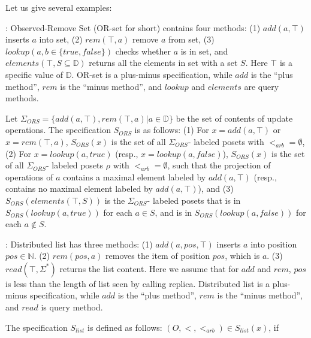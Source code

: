 Let us give several examples:

: Observed-Remove Set (OR-set for short) \cite{Shapiro:2011,Bieniusa:2012} contains four methods: (1) $add(a,\top)$ inserts $a$ into set, (2) $rem(\top,a)$ remove $a$ from set, (3) $lookup(a, b \in \{ \textit{true}, \textit{false} \})$ checks whether $a$ is in set, and $elements(\top, S \subseteq \mathbb{D})$ returns all the elements in set with a set $S$. Here $\top$ is a specific value of $\mathbb{D}$. OR-set is a plus-minus specification, while $add$ is the ``plus method'', $rem$ is the ``minus method'', and $lookup$ and $elements$ are query methods.


Let $\Sigma_{\textit{ORS}} = \{ add(a,\top),rem(\top,a) \vert a \in \mathbb{D} \}$ be the set of contents of update operations. The specification $S_{\textit{ORS}}$ is as follows: (1) For $x=add(a,\top)$ or $x = rem(\top,a)$, $S_{\textit{ORS}}(x)$ is the set of all $\Sigma_{\textit{ORS}}$- labeled posets with $<_{\textit{arb}} = \emptyset$, (2) For $x=lookup(a,\textit{true})$ (resp., $x=lookup(a,\textit{false})$), $S_{\textit{ORS}}(x)$ is the set of all $\Sigma_{\textit{ORS}}$- labeled posets $\rho$ with $<_{\textit{arb}} = \emptyset$, such that the projection of operations of $a$ contains a maximal element labeled by $add(a,\top)$ (resp., contains no maximal element labeled by $add(a,\top)$), and (3) $S_{\textit{ORS}}(elements(\top,S))$ is the $\Sigma_{\textit{ORS}}$- labeled posets that is in $S_{\textit{ORS}}(lookup(a,\textit{true}))$ for each $a \in S$, and is in $S_{\textit{ORS}}(lookup(a,\textit{false}))$ for each $a \notin S$.

: Distributed list has three methods: (1) $add(a,pos,\top)$ inserts $a$ into position $pos \in \mathbb{N}$. (2) $rem(pos,a)$ removes the item of position $pos$, which is $a$. (3) $read(\top,\Sigma^*)$ returns the list content. Here we assume that for $add$ and $rem$, $pos$ is less than the length of list seen by calling replica. Distributed list is a plus-minus specification, while $add$ is the ``plus method'', $rem$ is the ``minus method'', and $read$ is query method.

The specification $S_{\textit{list}}$ is defined as follows: $(O,<,<_{\textit{arb}}) \in S_{\textit{list}}(x)$, if

